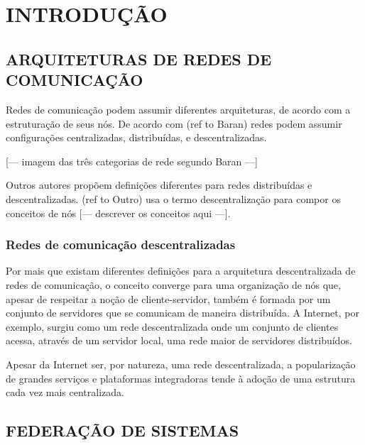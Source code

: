 \chapter{INTRODUÇÃO}


\section{ARQUITETURAS DE REDES DE COMUNICAÇÃO}


Redes de comunicação podem assumir diferentes arquiteturas, de acordo com a 
estruturação de seus nós. De acordo com (ref to Baran) redes podem assumir
configurações centralizadas, distribuídas, e descentralizadas. 

[--- imagem das três categorias de rede segundo Baran ---]

Outros autores propõem definições diferentes para redes distribuídas e
descentralizadas. (ref to Outro) usa o termo descentralização para compor os
conceitos de nós [--- descrever os conceitos aqui ---]. 


\subsection{Redes de comunicação descentralizadas}

Por mais que existam diferentes definições para a arquitetura descentralizada de
redes de comunicação, o conceito converge para uma organização de nós que, apesar
de respeitar a noção de cliente-servidor, também é formada por um conjunto de
servidores que se comunicam de maneira distribuída. A Internet, por exemplo, surgiu
como um rede descentralizada onde um conjunto de clientes acessa, através de um
servidor local, uma rede maior de servidores distribuídos.

Apesar da Internet ser, por natureza, uma rede descentralizada, a popularização de 
grandes serviços e plataformas integradoras tende à adoção de uma estrutura  cada
vez mais centralizada. %




\section{FEDERAÇÃO DE SISTEMAS}

